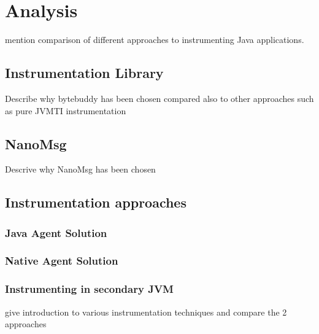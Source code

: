 \chapter{Analysis}
mention comparison of different approaches to instrumenting Java applications.

\section{Instrumentation Library}

Describe why bytebuddy has been chosen compared also to other approaches such as pure JVMTI instrumentation 

\section{NanoMsg}
 Descrive why NanoMsg has been chosen
\section{Instrumentation approaches}
\subsection{Java Agent Solution}
\subsection{Native Agent Solution}
\subsection{Instrumenting in secondary JVM}

give introduction to various instrumentation techniques and compare the 2 approaches


